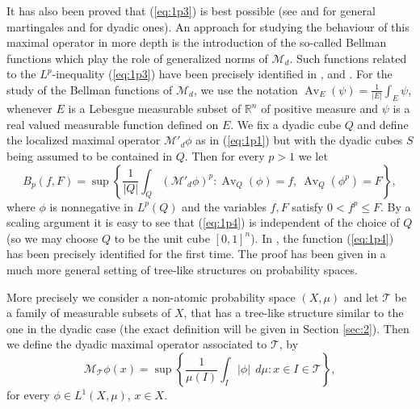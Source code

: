 \documentclass{article}
\numberwithin{equation}{section}
\theoremstyle{definition}
\theoremstyle{remark}
\newcommand{\mr}[1]{\mathrm{#1}}
\newcommand{\mb}[1]{\mathbb{#1}}
\newcommand{\mc}[1]{\mathcal{#1}}
\DeclareMathOperator{\Av}{Av} %
\begin{document}
It has also been proved that (\ref{eq:1p3}) is best possible (see \cite{B1} and \cite{B2} for general martingales and \cite{W} for dyadic ones). An approach for studying the behaviour of this maximal operator in more depth is the introduction of the so-called Bellman functions which play the role of generalized norms of $\mc M_d$. Such functions related to the $L^p$-inequality (\ref{eq:1p3}) have been precisely identified in \cite{M}, \cite{N5} and \cite{NM}. For the study of the Bellman functions of $\mc M_d$, we use the notation $\Av_E(\psi)=\frac{1}{|E|} \int_E \psi$, whenever $E$ is a Lebesgue measurable subset of $\mb R^n$ of positive measure and $\psi$ is a real valued measurable function defined on $E$. We fix a dyadic cube  $Q$ and define the localized maximal operator $\mc M'_d\phi$ as in (\ref{eq:1p1}) but with the dyadic cubes $S$ being assumed to be contained in $Q$. Then for every $p>1$ we let
%
\begin{equation} \label{eq:1p4}
B_p(f,F)=\sup\left\{ \frac{1}{|Q|} \int_Q (\mc M'_d\phi)^p: \Av_Q(\phi)=f,\ \Av_Q(\phi^p)=F \right\},
\end{equation}
%
where $\phi$ is nonnegative in $L^p(Q)$ and the variables $f, F$ satisfy $0<f^p\leq F$. By a scaling argument it is easy to see that (\ref{eq:1p4}) is independent of the choice of $Q$ (so we may choose
$Q$ to be the unit cube $[0,1]^n$).
%
In \cite{M}, the function (\ref{eq:1p4}) has been precisely identified for the first time. The proof has been given in a much more general setting of tree-like structures on probability spaces.

More precisely we consider a non-atomic probability space $(X,\mu)$ and let $\mc T$ be a family of measurable subsets of $X$, that has a tree-like structure similar to the one in the dyadic case (the exact definition will be given in Section \ref{sec:2}).
%
Then we define the dyadic maximal operator associated to $\mc T$, by
\begin{equation} \label{eq:1p5}
\mc M_{\mc T}\phi(x) = \sup \left\{ \frac{1}{\mu(I)} \int_I |\phi|\,\mr \; d\mu: x\in I\in \mc T \right\},
\end{equation}
for every $\phi\in L^1(X,\mu)$, $x\in X$.
\end{document}
